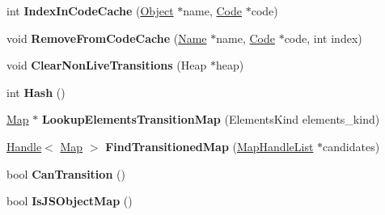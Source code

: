 \begin{DoxyCompactItemize}
\item 
\hypertarget{classv8_1_1internal_1_1_map_a4953534971ec96c5b5f41094c235f3b1}{}int {\bfseries Index\+In\+Code\+Cache} (\hyperlink{classv8_1_1internal_1_1_object}{Object} $\ast$name, \hyperlink{classv8_1_1internal_1_1_code}{Code} $\ast$code)\label{classv8_1_1internal_1_1_map_a4953534971ec96c5b5f41094c235f3b1}

\item 
\hypertarget{classv8_1_1internal_1_1_map_a53485d37dca0b06372b2d6fd14005db4}{}void {\bfseries Remove\+From\+Code\+Cache} (\hyperlink{classv8_1_1internal_1_1_name}{Name} $\ast$name, \hyperlink{classv8_1_1internal_1_1_code}{Code} $\ast$code, int index)\label{classv8_1_1internal_1_1_map_a53485d37dca0b06372b2d6fd14005db4}

\item 
\hypertarget{classv8_1_1internal_1_1_map_a8e7996a44567a56008a0dbb73f12385c}{}void {\bfseries Clear\+Non\+Live\+Transitions} (Heap $\ast$heap)\label{classv8_1_1internal_1_1_map_a8e7996a44567a56008a0dbb73f12385c}

\item 
\hypertarget{classv8_1_1internal_1_1_map_a7bd1d0fad31420aa3f15db2727b7e74f}{}int {\bfseries Hash} ()\label{classv8_1_1internal_1_1_map_a7bd1d0fad31420aa3f15db2727b7e74f}

\item 
\hypertarget{classv8_1_1internal_1_1_map_a1e058c851ca3232281e3eab6fc0ab7ca}{}\hyperlink{classv8_1_1internal_1_1_map}{Map} $\ast$ {\bfseries Lookup\+Elements\+Transition\+Map} (Elements\+Kind elements\+\_\+kind)\label{classv8_1_1internal_1_1_map_a1e058c851ca3232281e3eab6fc0ab7ca}

\item 
\hypertarget{classv8_1_1internal_1_1_map_aa61aa27d4dbb4ed955e4d732809ea39c}{}\hyperlink{classv8_1_1internal_1_1_handle}{Handle}$<$ \hyperlink{classv8_1_1internal_1_1_map}{Map} $>$ {\bfseries Find\+Transitioned\+Map} (\hyperlink{classv8_1_1internal_1_1_list}{Map\+Handle\+List} $\ast$candidates)\label{classv8_1_1internal_1_1_map_aa61aa27d4dbb4ed955e4d732809ea39c}

\item 
\hypertarget{classv8_1_1internal_1_1_map_a539d1405316167923c2c5380147e7074}{}bool {\bfseries Can\+Transition} ()\label{classv8_1_1internal_1_1_map_a539d1405316167923c2c5380147e7074}

\item 
\hypertarget{classv8_1_1internal_1_1_map_a7fede6e10d22529ccfcc47b63836f405}{}bool {\bfseries Is\+J\+S\+Object\+Map} ()\label{classv8_1_1internal_1_1_map_a7fede6e10d22529ccfcc47b63836f405}


\end{DoxyCompactItemize}
